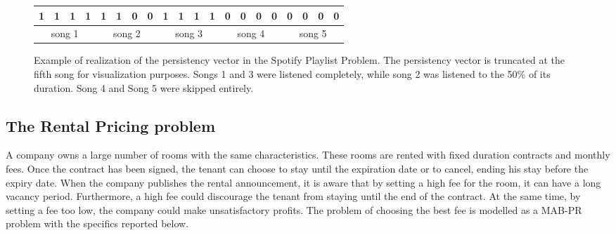 \begin{figure}[h]
	
	\centering
		\begin{tabular}{cccccccccccccccccccc}
			\hline
			\multicolumn{1}{|c}{1} & 1 & 1 & \multicolumn{1}{c|}{1} & 1 & 1 & 0 & \multicolumn{1}{c|}{0} & 1 & 1 & 1 & \multicolumn{1}{c|}{1} & 0 & 0 & 0 & \multicolumn{1}{c|}{0} & 0 & 0 & 0 & \multicolumn{1}{c|}{0} \\ \hline
			\multicolumn{4}{c}{song 1}                              & \multicolumn{4}{c}{song 2}         & \multicolumn{4}{c}{song 3}         & \multicolumn{4}{c}{song 4}         & \multicolumn{4}{c}{song 5}        
		\end{tabular}



\caption{Example of realization of the persistency vector in the Spotify Playlist Problem. The persistency vector is truncated at the fifth song for visualization purposes. Songs 1 and 3 were listened completely, while song 2 was listened to the 50\% of its duration. Song 4 and Song 5 were skipped entirely.}
\label{bucket_spotify}
\end{figure}






\subsection{The Rental Pricing problem}
A company owns a large number of rooms with the same characteristics. These rooms are rented with fixed duration contracts and monthly fees. Once the contract has been signed, the tenant can choose to stay until the expiration date or to cancel, ending his stay before the expiry date. When the company publishes the rental announcement, it is aware that by setting a high fee for the room, it can have a long vacancy period. Furthermore, a high fee could discourage the tenant from staying until the end of the contract. At the same time, by setting a fee too low, the company could make unsatisfactory profits. The problem of choosing the best fee is modelled as a MAB-PR problem with the specifics reported below.

